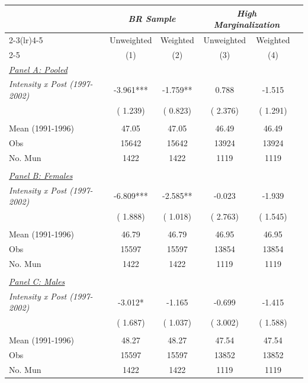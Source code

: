 \begin{tabular}{lccccc} \hline \hline
& \multicolumn{2}{c}{\textit{BR Sample}} 
& \multicolumn{2}{c}{\textit{High Marginalization}} \\ \cmidrule(lr){2-3}\cmidrule(lr){4-5}
& \multicolumn{1}{c}{Unweighted} & \multicolumn{1}{c}{Weighted} & \multicolumn{1}{c}{Unweighted} & \multicolumn{1}{c}{Weighted} \\ \cmidrule(lr){2-5}
& \multicolumn{1}{c}{(1)} & \multicolumn{1}{c}{(2)} & \multicolumn{1}{c}{(3)} & \multicolumn{1}{c}{(4)} \\ \toprule
\underline{\textit{Panel A: Pooled}} \\ 
\textit{Intensity x Post (1997-2002)}&    -3.961***&    -1.759**&     0.788&    -1.515 \\ 
 & (    1.239)& (    0.823)& (    2.376)& (    1.291) \\ 
  & & & & \\ 
Mean (1991-1996)&     47.05&     47.05&     46.49&     46.49 \\ 
Obs&     15642&     15642&     13924&     13924 \\ 
No. Mun&      1422&      1422&      1119&      1119 \\ 
  & & & & \\ 
\underline{\textit{Panel B: Females}} \\ 
\textit{Intensity x Post (1997-2002)}&    -6.809***&    -2.585**&    -0.023&    -1.939 \\ 
 & (    1.888)& (    1.018)& (    2.763)& (    1.545) \\ 
  & & & & \\ 
Mean (1991-1996)&     46.79&     46.79&     46.95&     46.95 \\ 
Obs&     15597&     15597&     13854&     13854 \\ 
No. Mun&      1422&      1422&      1119&      1119 \\ 
  & & & & \\ 
\underline{\textit{Panel C: Males}} \\ 
\textit{Intensity x Post (1997-2002)}&    -3.012*&    -1.165&    -0.699&    -1.415 \\ 
 & (    1.687)& (    1.037)& (    3.002)& (    1.588) \\ 
  & & & & \\ 
Mean (1991-1996)&     48.27&     48.27&     47.54&     47.54 \\ 
Obs&     15597&     15597&     13852&     13852 \\ 
No. Mun&      1422&      1422&      1119&      1119 \\ \bottomrule
\end{tabular}